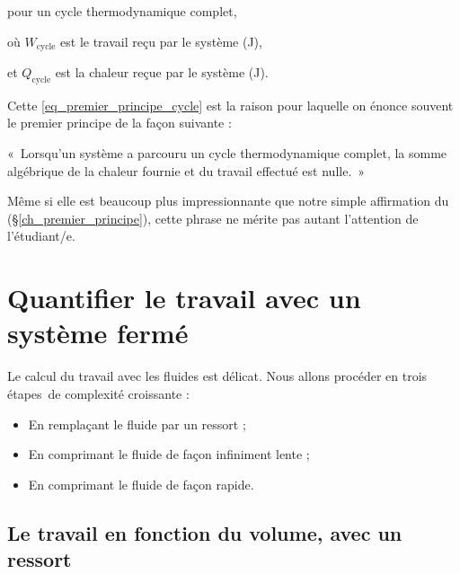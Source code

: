 	\begin{equationterms}
		\item pour un cycle thermodynamique complet,
		\item où \tab $W_{\text{cycle}}$ \tab est le travail reçu par le système (\si{\joule}),
		\item et \tab $Q_{\text{cycle}}$ \tab est la chaleur reçue par le système (\si{\joule}).
	\end{equationterms}

	Cette \cref{eq_premier_principe_cycle} est la raison pour laquelle on énonce souvent le premier principe de la façon suivante :

	«~Lorsqu’un système a parcouru un cycle thermodynamique complet, la somme algébrique de la chaleur fournie et du travail effectué est nulle.~»

	Même si elle est beaucoup plus impressionnante que notre simple affirmation du \coursunshort (\S\ref{ch_premier_principe}), cette phrase ne mérite pas autant l’attention de l’étudiant/e.




\section{Quantifier le travail avec un système fermé}

	Le calcul du travail avec les fluides est délicat. Nous allons procéder en trois étapes~de complexité croissante :

	\begin{itemize}
		\item En remplaçant le fluide par un ressort ;
		\item En comprimant le fluide de façon infiniment lente ;
		\item En comprimant le fluide de façon rapide.
	\end{itemize}



	\subsection{Le travail en fonction du volume, avec un ressort}
	\label{ch_travail_pdv}

